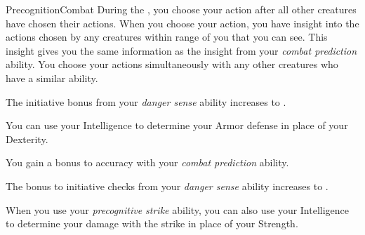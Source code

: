 \begin{feat}{Precognition}{Combat}
         During the , you choose your action after all other creatures have chosen their actions.
        When you choose your action, you have insight into the actions chosen by any creatures within \rngclose range of you that you can see.
        This insight gives you the same information as the insight from your \textit{combat prediction} ability.
        You choose your actions simultaneously with any other creatures who have a similar ability.

         The initiative bonus from your \textit{danger sense} ability increases to .

         You can use your Intelligence to determine your Armor defense in place of your Dexterity.

         You gain a  bonus to accuracy with your \textit{combat prediction} ability.

         The bonus to initiative checks from your \textit{danger sense} ability increases to .

         When you use your \textit{precognitive strike} ability, you can also use your Intelligence to determine your damage with the strike in place of your Strength.
    \end{feat}

